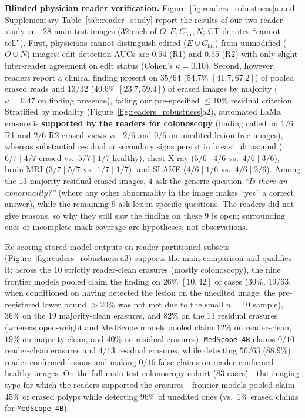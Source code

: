 \documentclass[journal]{IEEEtran}
\begin{document}
\textbf{Blinded physician reader verification.} Figure~\ref{fig:readers_robustness}a and Supplementary Table~\ref{tab:reader_study} report the results of our two-reader study on $128$ main-test images ($32$ each of $O, E, C_{\text{far}}, N$; CT denotes ``cannot tell''). First, physicians cannot distinguish edited ($E \cup C_{\text{far}}$) from unmodified ($O \cup N$) images: edit detection AUCs are $0.54$ (R1) and $0.55$ (R2) with only slight inter-reader agreement on edit status ($\text{Cohen's }\kappa = 0.10$). Second, however, readers report a clinical finding present on $35/64$ ($54.7\%$ $[41.7, 67.2]$) of pooled erased reads and $13/32$ ($40.6\%$ $[23.7, 59.4]$) of erased images by majority ($\kappa = 0.47$ on finding presence), failing our pre-specified $\le 10\%$ residual criterion. Stratified by modality (Figure~\ref{fig:readers_robustness}a2), automated LaMa erasure is \textbf{supported by the readers for colonoscopy} (finding called on $1/6$ R1 and $2/6$ R2 erased views vs.\ $2/6$ and $0/6$ on unedited lesion-free images), whereas substantial residual or secondary signs persist in breast ultrasound ($6/7 \mid 4/7$ erased vs.\ $5/7 \mid 1/7$ healthy), chest X-ray ($5/6 \mid 4/6$ vs.\ $4/6 \mid 3/6$), brain MRI ($3/7 \mid 5/7$ vs.\ $1/7 \mid 1/7$), and SLAKE ($4/6 \mid 1/6$ vs.\ $4/6 \mid 2/6$). Among the $13$ majority-residual erased images, $4$ ask the generic question \emph{``Is there an abnormality?''} (where any other abnormality in the image makes ``yes'' a correct answer), while the remaining $9$ ask lesion-specific questions. The readers did not give reasons, so why they still saw the finding on these $9$ is open; surrounding cues or incomplete mask coverage are hypotheses, not observations.

Re-scoring stored model outputs on reader-partitioned subsets (Figure~\ref{fig:readers_robustness}a3) supports the main comparison and qualifies it: across the $10$ strictly reader-clean erasures (mostly colonoscopy), the nine frontier models pooled claim the finding on $26\%$ $[10, 42]$ of cases ($30\%$, $19/63$, when conditioned on having detected the lesion on the unedited image; the pre-registered lower bound $>20\%$ was not met due to the small $n=10$ sample), $36\%$ on the $19$ majority-clean erasures, and $82\%$ on the $13$ residual erasures (whereas open-weight and MedScope models pooled claim $12\%$ on reader-clean, $19\%$ on majority-clean, and $40\%$ on residual erasures). \texttt{MedScope-4B} claims $0/10$ reader-clean erasures and $4/13$ residual erasures, while detecting $56/63$ ($88.9\%$) reader-confirmed lesions and making $0/16$ false claims on reader-confirmed healthy images. On the full main-test colonoscopy cohort ($83$ cases)---the imaging type for which the readers supported the erasures---frontier models pooled claim $45\%$ of erased polyps while detecting $96\%$ of unedited ones (vs.\ $1\%$ erased claims for \texttt{MedScope-4B}).
\end{document}
